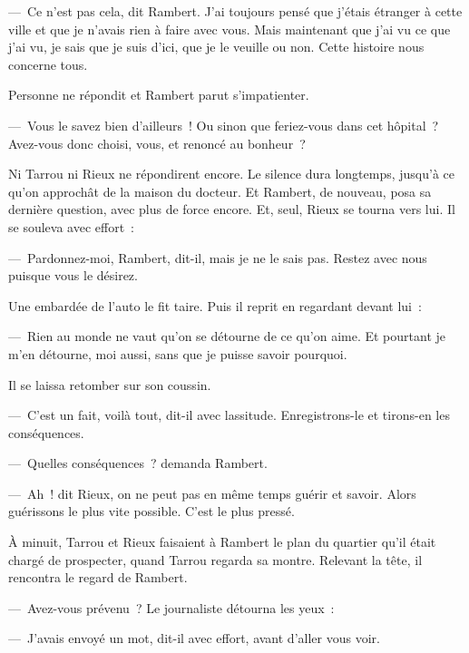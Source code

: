 \documentclass[french,twoside]{book} %
\begin{document}
— Ce n’est pas cela, dit Rambert. J’ai toujours pensé que j’étais étranger à cette ville et que je n’avais rien à faire avec vous. Mais maintenant que j’ai vu ce que j’ai vu, je sais que je suis d’ici, que je le veuille ou non. Cette histoire nous concerne tous.\par
Personne ne répondit et Rambert parut s’impatienter.\par
— Vous le savez bien d’ailleurs ! Ou sinon que feriez-vous dans cet hôpital ? Avez-vous donc choisi, vous, et renoncé au bonheur ?\par
Ni Tarrou ni Rieux ne répondirent encore. Le silence dura longtemps, jusqu’à ce qu’on approchât de la maison du docteur. Et Rambert, de nouveau, posa sa dernière question, avec plus de force encore. Et, seul, Rieux se tourna vers lui. Il se souleva avec effort :\par
— Pardonnez-moi, Rambert, dit-il, mais je ne le sais pas. Restez avec nous puisque vous le désirez.\par
Une embardée de l’auto le fit taire. Puis il reprit en regardant devant lui :\par
— Rien au monde ne vaut qu’on se détourne de ce qu’on aime. Et pourtant je m’en détourne, moi aussi, sans que je puisse savoir pourquoi.\par
Il se laissa retomber sur son coussin.\par
— C’est un fait, voilà tout, dit-il avec lassitude. Enregistrons-le et tirons-en les conséquences.\par
— Quelles conséquences ? demanda Rambert.\par
— Ah ! dit Rieux, on ne peut pas en même temps guérir et savoir. Alors guérissons le plus vite possible. C’est le plus pressé.\par
À minuit, Tarrou et Rieux faisaient à Rambert le plan du quartier qu’il était chargé de prospecter, quand Tarrou regarda sa montre. Relevant la tête, il rencontra le regard de Rambert.\par
— Avez-vous prévenu ? Le journaliste détourna les yeux :\par
— J’avais envoyé un mot, dit-il avec effort, avant d’aller vous voir.
\end{document}
